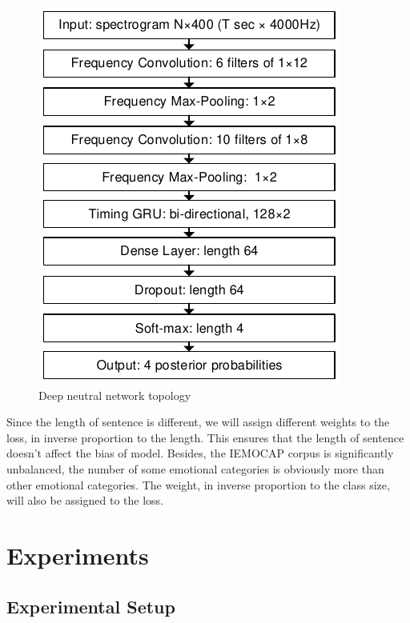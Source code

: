 \documentclass[a4paper]{article}
\begin{document}
\begin{figure}[!htb]
    \centering
    \centerline{\includegraphics{network}}
    \caption{Deep neutral network topology}
    \label{fig:network}
\end{figure}

Since the length of sentence is different, we will assign different weights to the loss, in inverse proportion to the length. This ensures that the length of sentence doesn't affect the bias of model. Besides, the IEMOCAP corpus is significantly unbalanced, the number of some emotional categories is obviously more than other emotional categories. The weight, in inverse proportion to the class size, will also be assigned to the loss.

\section{Experiments}
\label{sec:experiments}

\subsection{Experimental Setup}
\label{ssec:experimental setup}
\end{document}
